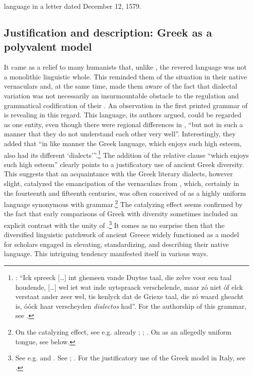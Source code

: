 language in a letter dated December 12, 1579.

\subsection{Justification and description: Greek as a polyvalent model}\label{sec:8.1.2}

It came as a relief to many humanists that, unlike , the revered  language was not a monolithic linguistic whole. This reminded them of the situation in their native vernaculars and, at the same time, made them aware of the fact that dialectal variation was not necessarily an insurmountable obstacle to the regulation and grammatical codification of their . An observation in the first printed grammar of  is revealing in this regard. This language, its authors argued, could be regarded as one entity, even though there were regional differences in , “but not in such a manner that they do not understand each other very well”. Interestingly, they added that “in like manner the Greek language, which enjoys such high esteem, also had its different ‘dialects’”.\footnote{\citet[110]{[spieghel]1584}: “Ick spreeck […] int ghemeen vande Duytse taal, die zelve voor een taal houdende, […] wel iet wat inde uytspraack verschelende, maar zó niet óf elck verstaat ander zeer wel, tis kenlyck dat de Griexe taal, die zó waard gheacht is, óóck haar verscheyden \textit{dialectos} had”. For the authorship of this grammar, see \citet{Peeters1982}.} The addition of the relative clause “which enjoys such high esteem” clearly points to a justificatory use of ancient Greek diversity. This suggests that an acquaintance with the Greek literary dialects, however slight, catalyzed the emancipation of the vernaculars from , which, certainly in the fourteenth and fifteenth centuries, was often conceived of as a highly uniform language synonymous with grammar.\footnote{On the catalyzing effect, see e.g. already \citet[688]{Bonfante1953}; \citet[9]{Trapp1990}; \citet[67]{Rhodes2015}. On  as an allegedly uniform tongue, see  below.} The catalyzing effect seems confirmed by the fact that early comparisons of Greek with  diversity sometimes included an explicit contrast with the unity of .\footnote{See e.g. \citet[\textsc{ii}.41]{Landino1974} and \citet[*.ii\textsc{\textsuperscript{v}}]{Manutius1496Aldus}. See \citet[172--173]{Alinei1984}; \citet[209--210, 215]{Trovato1984}. For the justificatory use of the Greek model in Italy, see \citet[46, 50]{Tavoni1998}.} It comes as no surprise then that the diversified linguistic patchwork of ancient Greece widely functioned as a model for scholars engaged in elevating, standardizing, and describing their native  language. This intriguing tendency manifested itself in various ways.

